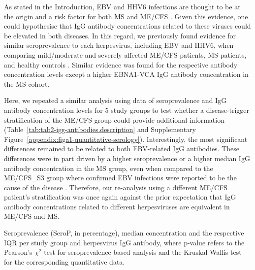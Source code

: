 As stated in the Introduction, EBV and HHV6 infections are thought to be at the origin and a risk factor for both MS \citep{lundstrom2022HumanHerpesvirus, soldan2023EpsteinBarr} and ME/CFS \citep{ruiz-pablos2021EpsteinBarrVirus}. Given this evidence, one could hypothesise that IgG antibody concentrations related to these viruses could be elevated in both diseases. In this regard, we previously found evidence for similar seroprevalence to each herpesvirus, including EBV and HHV6, when comparing mild/moderate and severely affected ME/CFS patients, MS patients, and healthy controls \citep{cliff2019CellularImmune}. Similar evidence was found for the respective antibody concentration levels except a higher EBNA1-VCA IgG antibody concentration in the MS cohort.

Here, we repeated a similar analysis using data of seroprevalence and IgG antibody concentration levels for 5 study groups to test whether a disease-trigger stratification of the ME/CFS group could provide additional information (Table~\ref{tab:tab2-igg-antibodies.description} and Supplementary Figure~\ref{appendix:figa1-quantitative-serology}). Interestingly, the most significant differences remained to be related to both EBV-related IgG antibodies. These differences were in part driven by a higher seroprevalence or a higher median IgG antibody concentration in the MS group, even when compared to the ME/CFS\_S3 group where confirmed EBV infections were reported to be the cause of the disease \citep{domingues2021HerpesvirusesSerologya}. Therefore, our re-analysis using a different ME/CFS patient's stratification was once again against the prior expectation that IgG antibody concentrations related to different herpesviruses are equivalent in ME/CFS and MS.


\begin{table}[h]
    \centering
    \caption[Seroprevalence, median concentration and respective IQR per study group and herpesvirus IgG antibody]{Seroprevalence (SeroP, in percentage), median concentration and the respective IQR per study group and herpesvirus IgG antibody, where p-value refers to the Pearson's $\chi^2$ test for seroprevalence-based analysis and the Kruskal-Wallis test for the corresponding quantitative data.}
    \resizebox{\linewidth}{!}{}
    \label{tab:tab2-igg-antibodies.description}
\end{table}

